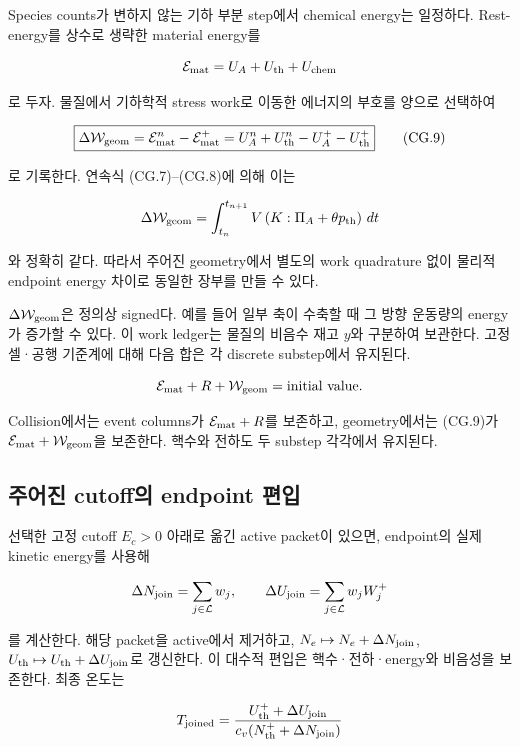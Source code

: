 Species counts가 변하지 않는 기하 부분 step에서 chemical energy는 일정하다. Rest-energy를 상수로 생략한 material energy를

\[
\mathcal E_{\rm mat}=U_A+U_{\rm th}+U_{\rm chem}
\]

로 두자. 물질에서 기하학적 stress work로 이동한 에너지의 부호를 양으로 선택하여

\[
\boxed{
\Delta\mathcal W_{\rm geom}
=\mathcal E_{\rm mat}^{n}-\mathcal E_{\rm mat}^{+}
=U_A^n+U_{\rm th}^n-U_A^+-U_{\rm th}^+
}
\tag{CG.9}
\]

로 기록한다. 연속식 (CG.7)--(CG.8)에 의해 이는

\[
\Delta\mathcal W_{\rm geom}
=\int_{t_n}^{t_{n+1}}
V\left(K:\Pi_A+\theta p_{\rm th}\right)\,dt
\]

와 정확히 같다. 따라서 주어진 geometry에서 별도의 work quadrature 없이 물리적 endpoint energy 차이로 동일한 장부를 만들 수 있다.

\(\Delta\mathcal W_{\rm geom}\)은 정의상 signed다. 예를 들어 일부 축이 수축할 때 그 방향 운동량의 energy가 증가할 수 있다. 이 work ledger는 물질의 비음수 재고 \(y\)와 구분하여 보관한다. 고정 셀·공행 기준계에 대해 다음 합은 각 discrete substep에서 유지된다.

\[
\mathcal E_{\rm mat}+R+\mathcal W_{\rm geom}=\text{initial value}.
\]

Collision에서는 event columns가 \(\mathcal E_{\rm mat}+R\)를 보존하고, geometry에서는 (CG.9)가 \(\mathcal E_{\rm mat}+\mathcal W_{\rm geom}\)을 보존한다. 핵수와 전하도 두 substep 각각에서 유지된다.

\hypertarget{uxc8fcuxc5b4uxc9c4-cutoffuxc758-endpoint-uxd3b8uxc785}{%
\subsection{주어진 cutoff의 endpoint 편입}\label{uxc8fcuxc5b4uxc9c4-cutoffuxc758-endpoint-uxd3b8uxc785}}

선택한 고정 cutoff \(E_c>0\) 아래로 옮긴 active packet이 있으면, endpoint의 실제 kinetic energy를 사용해

\[
\Delta N_{\rm join}=\sum_{j\in\mathcal L}w_j,\qquad
\Delta U_{\rm join}=\sum_{j\in\mathcal L}w_j W_j^+
\]

를 계산한다. 해당 packet을 active에서 제거하고, \(N_e\mapsto N_e+\Delta N_{\rm join}\), \(U_{\rm th}\mapsto U_{\rm th}+\Delta U_{\rm join}\)로 갱신한다. 이 대수적 편입은 핵수·전하·energy와 비음성을 보존한다. 최종 온도는

\[
T_{\rm joined}
=\frac{U_{\rm th}^{+}+\Delta U_{\rm join}}
{c_v(N_{\rm th}^{+}+\Delta N_{\rm join})}
\]


